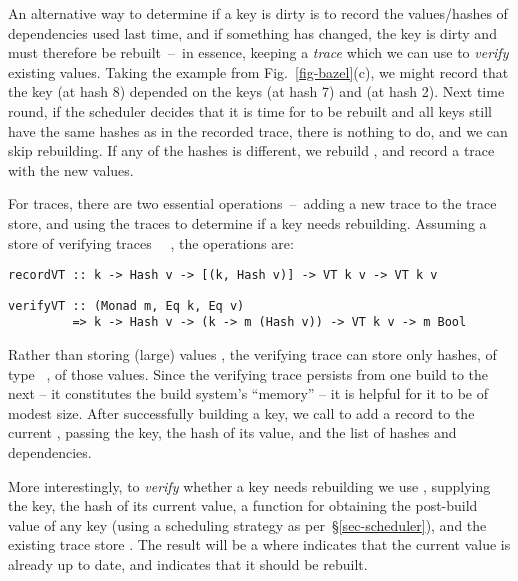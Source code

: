An alternative way to determine if a key is dirty is to record the
values/hashes of dependencies used last time, and if something has changed, the
key is dirty and must therefore be rebuilt~--~in essence, keeping a \emph{trace}
which we can use to \emph{verify} existing values. Taking the example from
Fig.~\ref{fig-bazel}(c), we might record that the key  (at hash 8)
depended on the keys  (at hash 7) and  (at hash 2). Next
time round, if the scheduler decides that it is time for  to be
rebuilt and all keys still have the same hashes as in the recorded trace, there
is nothing to do, and we can skip rebuilding. If any of the hashes is different,
we rebuild , and record a trace with the new values.

For traces, there are two essential operations~--~adding a new trace to the
trace store, and using the traces to determine if a key needs rebuilding.
Assuming a store of verifying traces ~~, the operations are:

\vspace{1mm}
\begin{verbatim}
recordVT :: k -> Hash v -> [(k, Hash v)] -> VT k v -> VT k v
\end{verbatim}
\vspace{-2mm}
\begin{verbatim}
verifyVT :: (Monad m, Eq k, Eq v)
         => k -> Hash v -> (k -> m (Hash v)) -> VT k v -> m Bool
\end{verbatim}
\vspace{1mm}

\noindent
Rather than storing (large) values , the verifying trace  can store
only hashes, of type ~, of those values. Since the verifying
trace persists from one build to the next -- it constitutes the build system's
``memory'' -- it is helpful for it to be of modest size. After successfully
building a key, we call  to add a record to the current ,
passing the key, the hash of its value, and the list of hashes and dependencies.

More interestingly, to \emph{verify} whether a key needs rebuilding we use
, supplying the key, the hash of its current value, a function for
obtaining the post-build value of any key (using a scheduling strategy as
per~\S\ref{sec-scheduler}), and the existing trace store . The result
will be a  where  indicates that the current value is already
up to date, and  indicates that it should be rebuilt.

